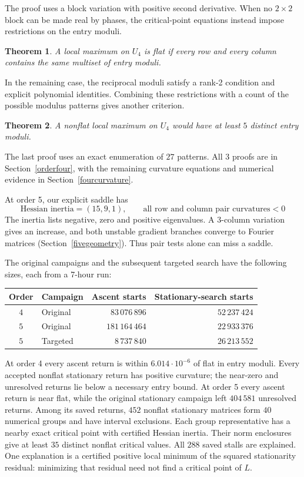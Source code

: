 \documentclass[11pt,a4paper]{article}
\newtheorem{introthm}{Theorem}
\begin{document}
The proof uses a block variation with positive second derivative.
When no $2\times2$ block can be made real by phases, the critical-point
equations instead impose restrictions on the entry moduli.

\begin{introthm}
A local maximum on $U_4$ is flat if every row and every column contains
the same multiset of entry moduli.
\end{introthm}

In the remaining case, the reciprocal moduli satisfy a rank-2
condition and explicit polynomial identities. Combining these
restrictions with a count of the possible modulus patterns gives
another criterion.

\begin{introthm}
A nonflat local maximum on $U_4$ would have at least $5$ distinct
entry moduli.
\end{introthm}

The last proof uses an exact enumeration of $27$ patterns. All 3
proofs are in Section~\ref{orderfour}, with the remaining curvature
equations and numerical evidence in Section~\ref{fourcurvature}.

At order 5, our explicit saddle has
\[
 \text{Hessian inertia}=(15,9,1),\qquad
 \text{all row and column pair curvatures}<0
\]
The inertia lists negative, zero and positive eigenvalues. A
3-column variation gives an increase, and both unstable gradient
branches converge to Fourier matrices (Section~\ref{fivegeometry}).
Thus pair tests alone can miss a saddle.

The original campaigns and the subsequent targeted search have the
following sizes, each from a 7-hour run:
\begin{center}
\begin{tabular}{clrr}
\toprule
Order & Campaign & Ascent starts & Stationary-search starts\\
\midrule
$4$ & Original & $83\,076\,896$ & $52\,237\,424$\\
$5$ & Original & $181\,164\,464$ & $22\,933\,376$\\
$5$ & Targeted & $8\,737\,840$ & $26\,213\,552$\\
\bottomrule
\end{tabular}
\end{center}
At order 4 every ascent return is within $6.014\cdot10^{-6}$ of
flat in entry moduli. Every accepted nonflat stationary return has
positive curvature; the near-zero and unresolved returns lie below a necessary
entry bound. At order 5 every ascent return is near flat, while
the original stationary campaign left $404\,581$ unresolved returns. Among its saved
returns, $452$ nonflat stationary matrices form $40$ numerical groups
and have interval exclusions. Each group representative has a nearby
exact critical point with certified Hessian inertia. Their norm
enclosures give at least $35$ distinct nonflat critical values.
All $288$ saved stalls are explained.
One explanation is a certified positive local minimum of the squared
stationarity residual: minimizing that residual need not find a
critical point of $L$.
\end{document}
